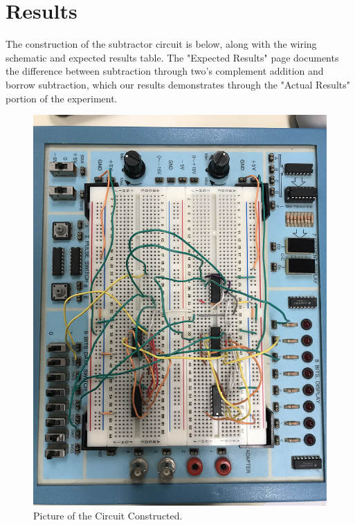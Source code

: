 \documentclass[11pt]{article}
\begin{document}
\section*{Results}

The construction of the subtractor circuit is below, along with the wiring schematic and expected results table. The "Expected Results" page documents the difference between subtraction through two's complement addition and borrow subtraction, which our results demonstrates through the "Actual Results" portion of the experiment.
\clearpage
\begin{figure}
	\includegraphics[width=1.0\textwidth]{"Circuit Picture"}
	\caption{Picture of the Circuit Constructed.}
\end{figure}
\clearpage
\end{document}
